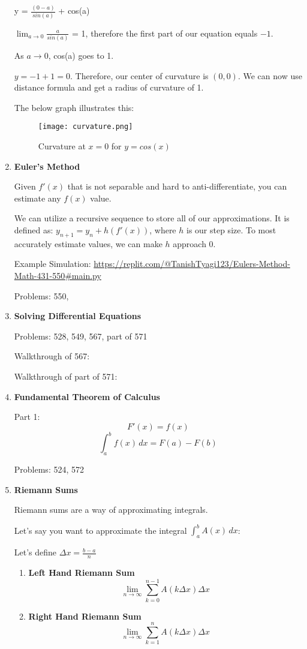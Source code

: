 \documentclass{article}
\begin{document}
\begin{enumerate}
y = \(\frac{(0-a)}{sin(a)}\) + cos(a)

\(\lim_{a\to0} \frac{a}{sin(a)}\) = 1, therefore the first part of our equation equals $-1$. 

As $a \rightarrow\text{0}$, cos(a) goes to 1. 

$y = -1 + 1 = 0.$ Therefore, our center of curvature is $(0,0).$ We can now use distance formula and get a radius of curvature of 1. 

The below graph illustrates this:

\begin{figure}[H]
\centering
\texttt{[image: curvature.png]}
\caption{Curvature at $x = 0$ for $y = cos(x)$ }
\end{figure}


\item \textbf{Euler's Method}

Given $f'(x)$ that is not separable and hard to anti-differentiate, you can estimate any $f(x)$ value. 

We can utilize a recursive sequence to store all of our approximations. It is defined as: $y_{n+1} = y_{n} + h(f'(x))$, where $h$ is our step size. To most accurately estimate values, we can make $h$ approach 0.

Example Simulation: \url{https://replit.com/@TanishTyagi123/Eulers-Method-Math-431-550#main.py}

Problems: 550, 

\item \textbf{Solving Differential Equations}

Problems: 528, 549, 567, part of 571

Walkthrough of 567: 

Walkthrough of part of 571:


\item \textbf{Fundamental Theorem of Calculus} 

Part 1: 
$$ F'(x) = f(x) $$
$$ \int_{a}^{b} f(x) \,dx = F(a) - F(b) $$

Problems: 524, 572

\item \textbf{Riemann Sums}

Riemann sums are a way of approximating integrals. 

Let's say you want to approximate the integral $\int_{a}^{b} A(x) \,dx$: 

Let's define $\Delta x = \frac{b - a}{n}$

    \begin{enumerate}
    \item \textbf{Left Hand Riemann Sum}
$$
\lim_{n\to\infty} \sum_{k=0} ^{n-1} A(k\Delta x)\Delta x 
$$
    \item \textbf{Right Hand Riemann Sum}
$$
\lim_{n\to\infty} \sum_{k=1} ^{n} A(k\Delta x)\Delta x 
$$


\end{enumerate}
\end{enumerate}
\end{document}
